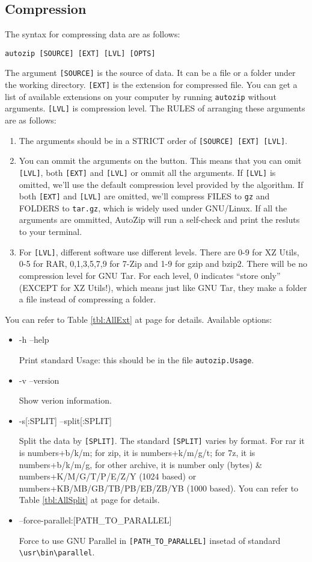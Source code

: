 \documentclass[journal,twocolumn]{IEEEtran}
\begin{document}
\subsection{Compression}
The syntax for compressing data are as follows:
\begin{verbatim}
autozip [SOURCE] [EXT] [LVL] [OPTS]
\end{verbatim}
The argument \verb|[SOURCE]| is the source of data. It can be a file or a folder under the working directory. \verb|[EXT]| is the extension for compressed file. You can get a list of available extensions on your computer by running \verb|autozip| without arguments. \verb|[LVL]| is compression level. The RULES of arranging these arguments are as follows:
\begin{enumerate}
\item The arguments should be in a STRICT order of \verb|[SOURCE] [EXT] [LVL]|.
\item You can ommit the arguments on the button. This means that you can omit \verb|[LVL]|, both \verb|[EXT]| and \verb|[LVL]| or ommit all the arguments. If \verb|[LVL]| is omitted, we'll use the default compression level provided by the algorithm. If both \verb|[EXT]| and \verb|[LVL]| are omitted, we'll compress FILES to \verb|gz| and FOLDERS to \verb|tar.gz|, which is widely used under GNU/Linux. If all the arguments are ommitted, AutoZip will run a self-check and print the resluts to your terminal.
\item For \verb|[LVL]|, different software use different levels. There are 0-9 for XZ Utils, 0-5 for RAR, 0,1,3,5,7,9 for 7-Zip and 1-9 for gzip and bzip2. There will be no compression level for GNU Tar. For each level, 0 indicates ``store only'' (EXCEPT for XZ Utils!), which means just like GNU Tar, they make a folder a file instead of compressing a folder.
\end{enumerate}
You can refer to Table \ref{tbl:AllExt} at page \pageref{tbl:AllExt} for details. Available options:
\begin{itemize}
\item -h \textbar --help \par Print standard Usage: this should be in the file \verb|autozip.Usage|.
\item -v \textbar --version \par Show verion information.
\item -s[:SPLIT] \textbar --split[:SPLIT] \par Split the data by \verb|[SPLIT]|. The standard \verb|[SPLIT]| varies by format. For rar it is numbers+b/k/m; for zip, it is numbers+k/m/g/t; for 7z, it is numbers+b/k/m/g, for other archive, it is number only (bytes) \& numbers+K/M/G/T/P/E/Z/Y (1024 based) or numbers+KB/MB/GB/TB/PB/EB/ZB/YB (1000 based). You can refer to Table \ref{tbl:AllSplit} at page \pageref{tbl:AllSplit} for details.
\item --force-parallel:[PATH\_TO\_PARALLEL] \par Force to use GNU Parallel in \verb|[PATH_TO_PARALLEL]| insetad of standard \verb|\usr\bin\parallel|.
\end{itemize}
\end{document}
